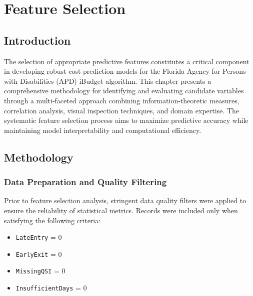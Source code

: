 %



\chapter{Feature Selection}
\label{ch:feature-selection}

\section{Introduction}
\label{sec:feature-selection-intro}

The selection of appropriate predictive features constitutes a critical component in developing robust cost prediction models for the Florida Agency for Persons with Disabilities (APD) iBudget algorithm. This chapter presents a comprehensive methodology for identifying and evaluating candidate variables through a multi-faceted approach combining information-theoretic measures, correlation analysis, visual inspection techniques, and domain expertise. The systematic feature selection process aims to maximize predictive accuracy while maintaining model interpretability and computational efficiency.

\section{Methodology}
\label{sec:feature-selection-methodology}

\subsection{Data Preparation and Quality Filtering}
\label{subsec:data-preparation}

Prior to feature selection analysis, stringent data quality filters were applied to ensure the reliability of statistical metrics. Records were included only when satisfying the following criteria:
\begin{itemize}
    \item \texttt{LateEntry} = 0
    \item \texttt{EarlyExit} = 0
    \item \texttt{MissingQSI} = 0
    \item \texttt{InsufficientDays} = 0
\end{itemize}

